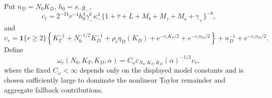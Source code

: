 Put \(n_D=N_0K_D\), \(h_0=s_-g_-\),
\[
 c_\dagger=2^{-24}r^{-4}h_0^4\gamma_-^8\kappa_-^4
 \{1+\bar\tau+L+M_b+M_z+M_\star+\gamma_+\}^{-8},
\]
and
\[
 \upsilon_r=
 \mathbf1\{r\ge2\}\left\{K_T^{-1}+N_0^{-1/2}K_D^{-1}
 +\rho_r\eta_D(K_D)+e^{-c_\dagger K_T/2}
 +e^{-c_\dagger n_D/2}\right\}
 +n_D^{-1}+e^{-c_\dagger n_D/2}.
\]
Define
\[
 \omega_r(N_0,K_T,K_D;\alpha)
 =C_\omega\varepsilon_{N_0,K_T,K_D}(\alpha)^{-1/2}\upsilon_r,
\]
where the fixed \(C_\omega<\infty\) depends only on the displayed model constants and is chosen sufficiently large to dominate the nonlinear Taylor remainder and aggregate fallback contributions.
